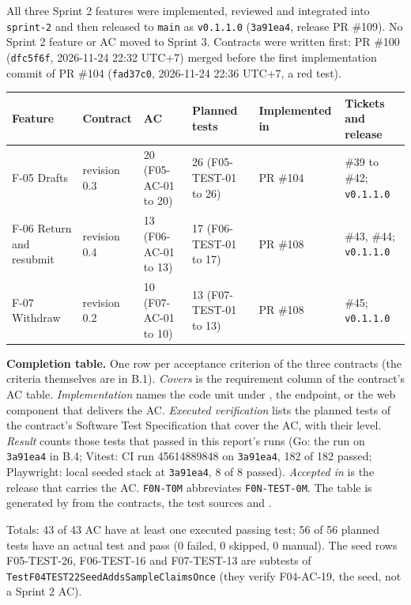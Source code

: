 \label{B:2}

All three Sprint 2 features were implemented, reviewed and integrated into \texttt{sprint-2} and then released to \texttt{main} as \texttt{v0.1.1.0} (\texttt{3a91ea4}, release PR \#109). No Sprint 2 feature or AC moved to Sprint 3. Contracts were written first: PR \#100 (\texttt{dfc5f6f}, 2026-11-24 22:32 UTC+7) merged before the first implementation commit of PR \#104 (\texttt{fad37c0}, 2026-11-24 22:36 UTC+7, a red test).

\begin{center}\small\setlength{\tabcolsep}{3pt}
\begin{tabular}{@{}p{2.6cm}p{1.9cm}p{2.4cm}p{2.8cm}p{2.1cm}p{3.1cm}@{}}
\toprule \textbf{Feature} & \textbf{Contract} & \textbf{AC} & \textbf{Planned tests} & \textbf{Implemented in} & \textbf{Tickets and release} \\ \midrule
F-05 Drafts & revision 0.3 & 20 (F05-AC-01 to 20) & 26 (F05-TEST-01 to 26) & PR \#104 & \#39 to \#42; \texttt{v0.1.1.0} \\
F-06 Return and resubmit & revision 0.4 & 13 (F06-AC-01 to 13) & 17 (F06-TEST-01 to 17) & PR \#108 & \#43, \#44; \texttt{v0.1.1.0} \\
F-07 Withdraw & revision 0.2 & 10 (F07-AC-01 to 10) & 13 (F07-TEST-01 to 13) & PR \#108 & \#45; \texttt{v0.1.1.0} \\
\bottomrule
\end{tabular}
\end{center}

\textbf{Completion table.} One row per acceptance criterion of the three contracts (the criteria themselves are in B.1). \emph{Covers} is the requirement column of the contract's AC table. \emph{Implementation} names the code unit under , the endpoint, or the web component that delivers the AC. \emph{Executed verification} lists the planned tests of the contract's Software Test Specification that cover the AC, with their level. \emph{Result} counts those tests that passed in this report's runs (Go: the run on \texttt{3a91ea4} in B.4; Vitest: CI run 45614889848 on \texttt{3a91ea4}, 182 of 182 passed; Playwright: local seeded stack at \texttt{3a91ea4}, 8 of 8 passed). \emph{Accepted in} is the release that carries the AC.
\texttt{F0N-T0M} abbreviates \texttt{F0N-TEST-0M}. The table is generated by  from the contracts, the test sources and .



\noindent Totals: 43 of 43 AC have at least one executed passing test; 56 of 56 planned tests have an actual test and pass (0 failed, 0 skipped, 0 manual). The seed rows F05-TEST-26, F06-TEST-16 and F07-TEST-13 are subtests of \texttt{TestF04TEST22SeedAddsSampleClaimsOnce} (they verify F04-AC-19, the seed, not a Sprint 2 AC).
